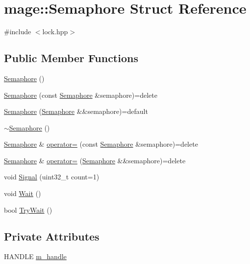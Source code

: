 \hypertarget{structmage_1_1_semaphore}{}\section{mage\+:\+:Semaphore Struct Reference}
\label{structmage_1_1_semaphore}


{\ttfamily \#include $<$lock.\+hpp$>$}

\subsection*{Public Member Functions}
\begin{DoxyCompactItemize}
\item 
\hyperlink{structmage_1_1_semaphore_a7b4f53c18b9a244ed98ef58fa5cfa2bb}{Semaphore} ()
\item 
\hyperlink{structmage_1_1_semaphore_a8873b2ed82ff66d323a8c3cebf0fb5c0}{Semaphore} (const \hyperlink{structmage_1_1_semaphore}{Semaphore} \&semaphore)=delete
\item 
\hyperlink{structmage_1_1_semaphore_a78484faaaff49a28c1f9ec7ad61f526f}{Semaphore} (\hyperlink{structmage_1_1_semaphore}{Semaphore} \&\&semaphore)=default
\item 
\hyperlink{structmage_1_1_semaphore_a991ed365c28e4a9c63ff34a5efeb012d}{$\sim$\+Semaphore} ()
\item 
\hyperlink{structmage_1_1_semaphore}{Semaphore} \& \hyperlink{structmage_1_1_semaphore_af3308cf7fa1ed33cda0ee53b9565f658}{operator=} (const \hyperlink{structmage_1_1_semaphore}{Semaphore} \&semaphore)=delete
\item 
\hyperlink{structmage_1_1_semaphore}{Semaphore} \& \hyperlink{structmage_1_1_semaphore_a7ce33136147e745f75d51abc77cd845c}{operator=} (\hyperlink{structmage_1_1_semaphore}{Semaphore} \&\&semaphore)=delete
\item 
void \hyperlink{structmage_1_1_semaphore_ade44c79f534e30d969e9ea89169d5504}{Signal} (uint32\+\_\+t count=1)
\item 
void \hyperlink{structmage_1_1_semaphore_ae63599939b6bcc3939cbeddd7ffa5f66}{Wait} ()
\item 
bool \hyperlink{structmage_1_1_semaphore_ab34cdf4e9b7388dbdb30aab167c074f6}{Try\+Wait} ()
\end{DoxyCompactItemize}
\subsection*{Private Attributes}
\begin{DoxyCompactItemize}
\item 
H\+A\+N\+D\+LE \hyperlink{structmage_1_1_semaphore_ac1ded856984b4ac3739d9ff627838fda}{m\+\_\+handle}
\end{DoxyCompactItemize}


